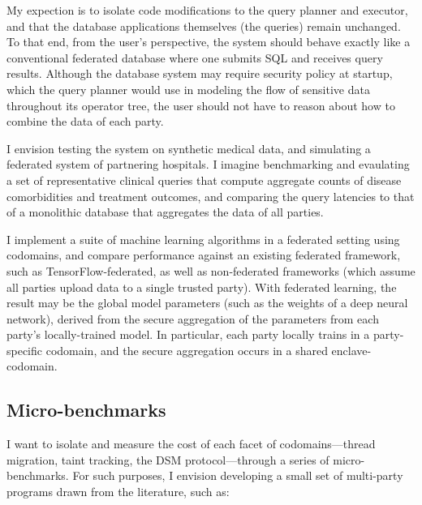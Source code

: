 My expection is to isolate code modifications to the query planner and
executor, and that the database
applications themselves (the queries) remain unchanged. 
%
To that end, from the user's perspective, the system should behave
exactly like a conventional federated database where one submits SQL and
receives query results. 
%
Although the database system may require security policy at startup, which the
query planner would use in modeling the flow of sensitive data throughout its
operator tree, the user should not have to reason about how to combine the data
of each party.


I envision testing the system on synthetic medical data, and simulating a
federated system of partnering hospitals.
%
I imagine benchmarking and evaulating a set of representative clinical queries
that compute aggregate counts of disease comorbidities and treatment outcomes,
and comparing the query latencies to that of a monolithic database that
aggregates the data of all parties.







%
I implement a suite of machine learning algorithms in a federated setting using
codomains, and compare performance against an existing federated framework,
such as TensorFlow-federated, as well as non-federated frameworks (which
assume all parties upload data to a single trusted party).
%
With federated learning, the result may be the global model parameters (such
as the weights of a deep neural network), derived from the secure aggregation of the
parameters from each party's locally-trained model.
%
In particular, each party locally trains in a party-specific codomain, and the
secure aggregation occurs in a shared enclave-codomain.


\subsection{Micro-benchmarks}

I want to isolate and measure the cost
of each facet of codomains---thread migration, taint tracking, the DSM
protocol---through a series of micro-benchmarks.
%
For such purposes, I envision developing a small set of multi-party programs
drawn from the literature, such as:

